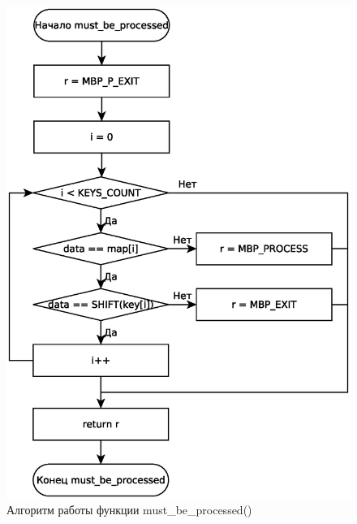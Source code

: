 \begin{figure}[p]
	\centering
	\includegraphics[scale=0.5]{must_be_processed.eps}
	\caption*{Алгоритм работы функции must\_be\_processed()}
\end{figure}
